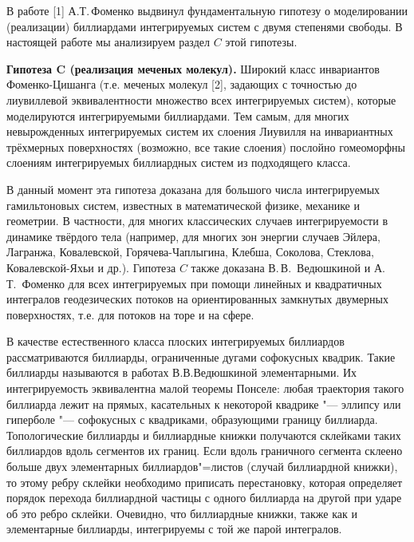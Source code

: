 \vzmscaption
В работе [1] А.Т.\,Фоменко выдвинул фундаментальную гипотезу о моделировании (реализации) биллиардами интегрируемых систем с двумя степенями свободы.
В настоящей работе мы анализируем раздел $C$ этой гипотезы.

\textbf{Гипотеза C (реализация меченых молекул).} Широкий класс инвариантов Фоменко\--Цишанга (т.е. меченых молекул [2], задающих с точностью до лиувиллевой эквивалентности множество всех интегрируемых систем), которые моделируются интегрируемыми биллиардами. Тем самым, для многих невырожденных интегрируемых систем их слоения Лиувилля на инвариантных
трёхмерных поверхностях (возможно, все такие слоения) послойно гомеоморфны слоениям интегрируемых биллиардных систем из подходящего класса.

В данный момент эта гипотеза доказана для большого числа интегрируемых гамильтоновых систем, известных в математической физике, механике и геометрии. В частности, для многих классических случаев интегрируемости в динамике твёрдого тела (например, для многих зон энергии случаев Эйлера, Лагранжа, Ковалевской, Горячева\--Чаплыгина, Клебша, Соколова, Стеклова, Ковалевской\--Яхьи и др.). Гипотеза $C$ также доказана В.\,В.~Ведюшкиной и А.\,Т.~Фоменко для всех интегрируемых при помощи линейных и квадратичных интегралов геодезических потоков на ориентированных замкнутых двумерных поверхностях, т.е. для потоков на торе и на сфере.

В качестве естественного класса плоских интегрируемых биллиардов рассматриваются биллиарды, ограниченные дугами софокусных квадрик. Такие биллиарды называются в работах В.В.Ведюшкиной элементарными. Их интегрируемость эквивалентна малой теоремы Понселе: любая траектория такого биллиарда лежит на прямых, касательных к некоторой квадрике "--- эллипсу или гиперболе "--- софокусных с квадриками, образующими границу биллиарда. Топологические биллиарды и биллиардные книжки получаются склейками таких биллиардов вдоль сегментов их границ. Если вдоль граничного сегмента склеено больше двух элементарных биллиардов"=листов (случай биллиардной книжки), то этому ребру склейки необходимо приписать перестановку, которая определяет порядок перехода биллиардной частицы с одного биллиарда на другой при ударе об это ребро склейки. Очевидно, что биллиардные книжки, также как и элементарные биллиарды, интегрируемы с той же парой интегралов.

